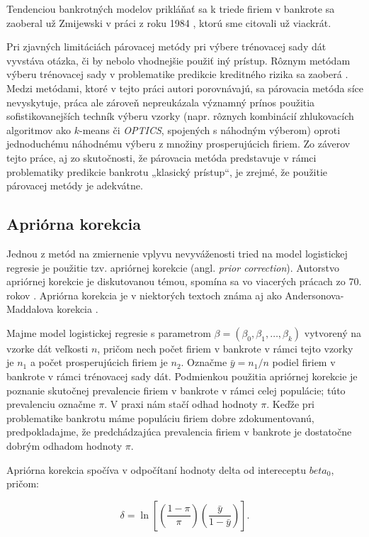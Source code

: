 Tendenciou bankrotných modelov prikláňať sa k triede firiem v bankrote sa zaoberal už Zmijewski v práci z roku 1984 \cite{zmijewski}, ktorú sme citovali už viackrát.

Pri zjavných limitáciách párovacej metódy pri výbere trénovacej sady dát vyvstáva otázka, či by nebolo vhodnejšie použiť iný prístup.
Rôznym metódam výberu trénovacej sady v problematike predikcie kreditného rizika sa zaoberá \cite{protopapadakis}.
Medzi metódami, ktoré v tejto práci autori porovnávajú, sa párovacia metóda síce nevyskytuje, práca ale zároveň nepreukázala významný prínos použitia sofistikovanejších techník výberu vzorky
(napr. rôznych kombinácií zhlukovacích algoritmov ako \(k\)-means či \emph{OPTICS}, spojených s náhodným výberom) oproti jednoduchému náhodnému výberu z množiny prosperujúcich firiem.
Zo záverov tejto práce, aj zo skutočnosti, že párovacia metóda predstavuje v rámci problematiky predikcie bankrotu „klasický prístup“, je zrejmé, že použitie párovacej metódy je adekvátne.

\subsection{Apriórna korekcia}

Jednou z metód na zmiernenie vplyvu nevyváženosti tried na model logistickej regresie je použitie tzv. apriórnej korekcie (angl. \emph{prior correction}).
Autorstvo apriórnej korekcie je diskutovanou témou, spomína sa vo viacerých prácach zo 70. rokov \cite{manski, bishop, anderson}.
Apriórna korekcia je v niektorých textoch známa aj ako Andersonova-Maddalova korekcia \cite{maddala}.

Majme model logistickej regresie s parametrom \(\beta = (\beta_0, \beta_1, \ldots, \beta_k) \) vytvorený na vzorke dát veľkosti \(n\),
pričom nech počet firiem v bankrote v rámci tejto vzorky je \(n_1\) a počet prosperujúcich firiem je \(n_2\).
Označme \( \bar{y} = n_1/n \) podiel firiem v bankrote v rámci trénovacej sady dát.
Podmienkou použitia apriórnej korekcie je poznanie skutočnej prevalencie firiem v bankrote v rámci celej populácie; túto prevalenciu označme \(\pi\).
V praxi nám stačí odhad hodnoty \(\pi\).
Keďže pri problematike bankrotu máme populáciu firiem dobre zdokumentovanú, predpokladajme, že predchádzajúca prevalencia firiem v bankrote je dostatočne dobrým odhadom hodnoty \(\pi\).

Apriórna korekcia spočíva v odpočítaní hodnoty delta od intereceptu \(beta_0\), pričom:

\[
    \delta = \ln \left[ \left( \frac{1 - \pi}{\pi} \right) \left( \frac{\bar{y}}{1 - \bar{y}} \right) \right].
\]

